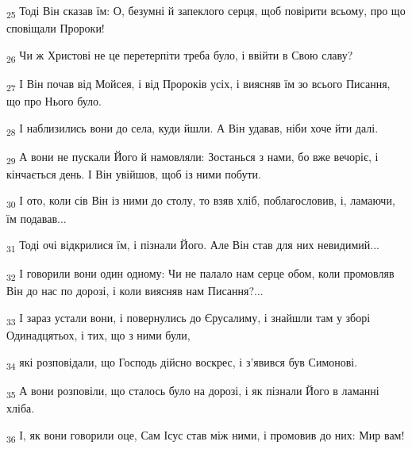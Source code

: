 \begin{tcolorbox}
\textsubscript{25} Тоді Він сказав їм: О, безумні й запеклого серця, щоб повірити всьому, про що сповіщали Пророки!
\end{tcolorbox}
\begin{tcolorbox}
\textsubscript{26} Чи ж Христові не це перетерпіти треба було, і ввійти в Свою славу?
\end{tcolorbox}
\begin{tcolorbox}
\textsubscript{27} І Він почав від Мойсея, і від Пророків усіх, і виясняв їм зо всього Писання, що про Нього було.
\end{tcolorbox}
\begin{tcolorbox}
\textsubscript{28} І наблизились вони до села, куди йшли. А Він удавав, ніби хоче йти далі.
\end{tcolorbox}
\begin{tcolorbox}
\textsubscript{29} А вони не пускали Його й намовляли: Зостанься з нами, бо вже вечоріє, і кінчається день. І Він увійшов, щоб із ними побути.
\end{tcolorbox}
\begin{tcolorbox}
\textsubscript{30} І ото, коли сів Він із ними до столу, то взяв хліб, поблагословив, і, ламаючи, їм подавав...
\end{tcolorbox}
\begin{tcolorbox}
\textsubscript{31} Тоді очі відкрилися їм, і пізнали Його. Але Він став для них невидимий...
\end{tcolorbox}
\begin{tcolorbox}
\textsubscript{32} І говорили вони один одному: Чи не палало нам серце обом, коли промовляв Він до нас по дорозі, і коли виясняв нам Писання?...
\end{tcolorbox}
\begin{tcolorbox}
\textsubscript{33} І зараз устали вони, і повернулись до Єрусалиму, і знайшли там у зборі Одинадцятьох, і тих, що з ними були,
\end{tcolorbox}
\begin{tcolorbox}
\textsubscript{34} які розповідали, що Господь дійсно воскрес, і з'явився був Симонові.
\end{tcolorbox}
\begin{tcolorbox}
\textsubscript{35} А вони розповіли, що сталось було на дорозі, і як пізнали Його в ламанні хліба.
\end{tcolorbox}
\begin{tcolorbox}
\textsubscript{36} І, як вони говорили оце, Сам Ісус став між ними, і промовив до них: Мир вам!
\end{tcolorbox}
